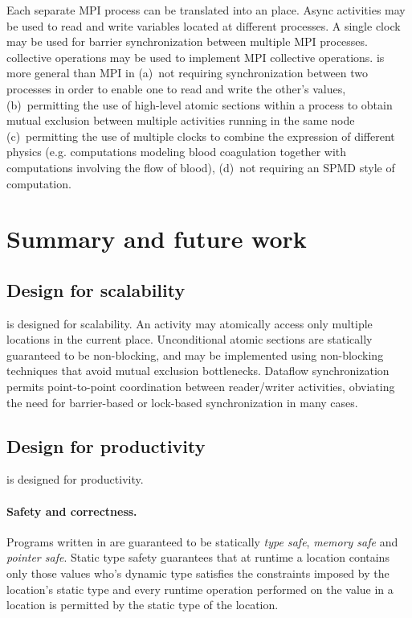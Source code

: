 Each separate MPI process can be translated into an \Xten{}
place. Async activities may be used to read and write variables
located at different processes. A single clock may be used for barrier
synchronization between multiple MPI processes. \Xten{} collective
operations may be used to implement MPI collective operations.
\Xten{} is more general than MPI in (a)~not requiring synchronization
between two processes in order to enable one to read and write the
other's values, (b)~permitting the use of high-level atomic sections
within a process to obtain mutual exclusion between multiple
activities running in the same node (c)~permitting the use of multiple
clocks to combine the expression of different physics (e.g.{}
computations modeling blood coagulation together with computations
involving the flow of blood), (d)~not requiring an SPMD style of
computation.


\section{Summary and future work}
\subsection{Design for scalability}
\Xten{} is designed for scalability. An activity may atomically
access only multiple locations in the current place. Unconditional
atomic sections are statically guaranteed to be non-blocking, and may
be implemented using non-blocking techniques that avoid mutual
exclusion bottlenecks. Dataflow synchronization permits point-to-point
coordination between reader/writer activities, obviating the need for
barrier-based or lock-based synchronization in many cases.

\subsection{Design for productivity}
\Xten{} is designed for productivity. 

\paragraph{Safety and correctness.} 
Programs written in \Xten{} are guaranteed to be statically {\em type
safe}, {\em memory safe} and {\em pointer safe}. Static type safety
guarantees that at runtime a location contains only those values who's
dynamic type satisfies the constraints imposed by the location's
static type and every runtime operation performed on the value in a
location is permitted by the static type of the location.

